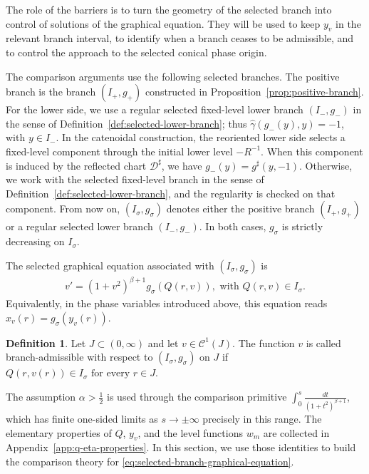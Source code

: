 \documentclass{amsart}
\theoremstyle{plain}
\theoremstyle{mainintrothm}
\theoremstyle{definition}
\newtheorem{definition}[theorem]{Definition}
\begin{document}
	\medskip
	
	The role of the barriers is to turn the geometry of the selected branch into
	control of solutions of the graphical equation.  They will be used to keep
	$y_v$ in the relevant branch interval, to identify when a branch ceases to be
	admissible, and to control the approach to the selected conical phase origin.
	
	\medskip
	
	The comparison arguments use the following selected branches.  The positive
	branch is the branch $(I_+,g_+)$ constructed in
	Proposition~\ref{prop:positive-branch}.  For the lower side, we use a regular
	selected fixed-level lower branch $(I_-,g_-)$ in the sense of
	Definition~\ref{def:selected-lower-branch}; thus
	$\widehat\gamma(g_-(y),y)=-1$, with $y\in I_-$.  In the catenoidal
	construction, the reoriented lower side selects a fixed-level component through
	the initial lower level $-R^{-1}$.  When this component
	is induced by the reflected chart $\mathcal D^\sharp$, we have
	$g_-(y)=g^\sharp(y,-1)$.  Otherwise, we work with the selected fixed-level
	branch in the sense of Definition~\ref{def:selected-lower-branch}, and the
	regularity is checked on that component. From now on, $(I_\sigma,g_\sigma)$ denotes either the positive
	branch $(I_+,g_+)$ or a regular selected lower branch $(I_-,g_-)$.  In both
	cases, $g_\sigma$ is strictly decreasing on $I_\sigma$.
	\medskip
	
	The selected graphical equation associated with $(I_\sigma,g_\sigma)$ is
	\begin{align}
		\label{eq:selected-branch-graphical-equation}
		v'
		=
		(1+v^2)^{\beta+1}g_\sigma(Q(r,v)),
		\mbox{ with }
		Q(r,v)\in I_\sigma.
	\end{align}
	Equivalently, in the phase variables introduced above, this equation reads
	$x_v(r)=g_\sigma(y_v(r))$.

	\medskip
	
	\begin{definition}
		\label{def:branch-admissible-functions}
		Let $J\subset(0,\infty)$ and let $v\in\mathcal C^1(J)$.  The function $v$ is
		called
		branch-admissible with respect to $(I_\sigma,g_\sigma)$ on $J$ if $Q(r,v(r))\in I_\sigma\text{ for every }r\in J$.
	\end{definition}
	
	
	The assumption $\alpha>\frac{1}{2}$ is used through the comparison primitive
	$\int_0^s\frac{dt}{(1+t^2)^{\beta+1}}$, which has finite one-sided limits as
	$s\to\pm\infty$ precisely in this range.  The elementary properties of $Q$,
	$y_v$, and the level functions $w_m$ are collected in
	Appendix~\ref{app:q-eta-properties}.  In this section, we use those identities
	to build the comparison theory for
	\eqref{eq:selected-branch-graphical-equation}.
	
\end{document}
